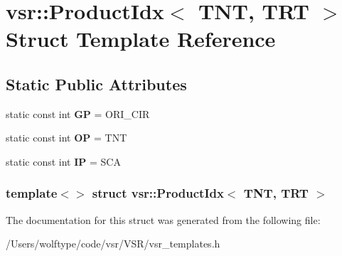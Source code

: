 \hypertarget{structvsr_1_1_product_idx_3_01_t_n_t_00_01_t_r_t_01_4}{\section{vsr\-:\-:Product\-Idx$<$ T\-N\-T, T\-R\-T $>$ Struct Template Reference}
\label{structvsr_1_1_product_idx_3_01_t_n_t_00_01_t_r_t_01_4}
}
\subsection*{Static Public Attributes}
\begin{DoxyCompactItemize}
\item 
\hypertarget{structvsr_1_1_product_idx_3_01_t_n_t_00_01_t_r_t_01_4_aa12980e900f514d725700bc46fd47ffd}{static const int {\bfseries G\-P} = O\-R\-I\-\_\-\-C\-I\-R}\label{structvsr_1_1_product_idx_3_01_t_n_t_00_01_t_r_t_01_4_aa12980e900f514d725700bc46fd47ffd}

\item 
\hypertarget{structvsr_1_1_product_idx_3_01_t_n_t_00_01_t_r_t_01_4_a0f93bfa38d5009f2c3cf1ed98ff98df4}{static const int {\bfseries O\-P} = T\-N\-T}\label{structvsr_1_1_product_idx_3_01_t_n_t_00_01_t_r_t_01_4_a0f93bfa38d5009f2c3cf1ed98ff98df4}

\item 
\hypertarget{structvsr_1_1_product_idx_3_01_t_n_t_00_01_t_r_t_01_4_a333551731637d537b4458319231a07f6}{static const int {\bfseries I\-P} = S\-C\-A}\label{structvsr_1_1_product_idx_3_01_t_n_t_00_01_t_r_t_01_4_a333551731637d537b4458319231a07f6}

\end{DoxyCompactItemize}
\subsubsection*{template$<$$>$ struct vsr\-::\-Product\-Idx$<$ T\-N\-T, T\-R\-T $>$}



The documentation for this struct was generated from the following file\-:\begin{DoxyCompactItemize}
\item 
/\-Users/wolftype/code/vsr/\-V\-S\-R/vsr\-\_\-templates.\-h\end{DoxyCompactItemize}
